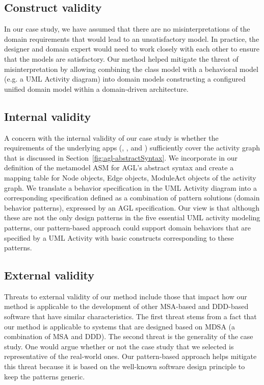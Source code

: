 \subsection{Construct validity}
In our case study, we have assumed that there are no misinterpretations of the domain requirements that would lead to an unsatisfactory model. In practice, the designer and domain expert would need to work closely with each other to ensure that the models are satisfactory.
Our method helped mitigate the threat of misinterpretation by allowing combining the class model with a behavioral model (e.g. a UML Activity
diagram) into domain models constructing a configured unified domain model within a domain-driven architecture.
%
\subsection{Internal validity}
A concern with the internal validity of our case study is whether the requirements of the underlying apps (\courseman, \processman, and \orderman) sufficiently cover the activity graph that is discussed in Section~\ref{fig:agl-abstractSyntax}. We incorporate in our definition of the metamodel ASM for AGL's abstract syntax and create a mapping table for Node objects, Edge objects, ModuleAct objects of the activity graph. We translate a behavior specification in the UML Activity diagram into a corresponding specification defined as a combination of pattern solutions (domain behavior patterns), expressed by an AGL specification. Our view is that although these are not the only design patterns in the five essential UML activity modeling patterns, our pattern-based approach could support domain behaviors that are specified by a UML Activity with basic constructs corresponding to these patterns.
%
\subsection{External validity}
Threats to external validity of our method include those that impact how our method is applicable to the development of other MSA-based and DDD-based software that have similar characteristics. The first threat stems from a fact that our method is applicable to systems that are designed based on MDSA (a combination of MSA and DDD). The second threat is the generality of the case study. One would argue whether or not the case study that we selected is representative of the real-world ones. Our pattern-based approach helps mitigate this threat because it is based on the well-known software design principle to keep the patterns generic.